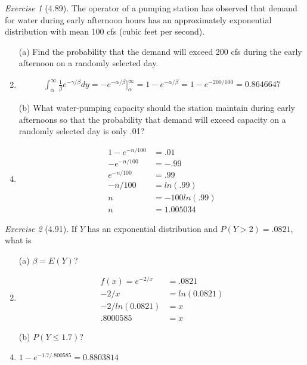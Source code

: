 \documentclass[12pt]{amsart}
\makeatletter
\theoremstyle{remark}
\newtheorem*{exercise}{Exercise}%
\renewenvironment{proof}[1][\proofname]{\par\doublespacing
  \pushQED{\qed}%
  \normalfont \topsep6\p@\@plus6\p@\relax
  \list{}{%
    \settowidth{\leftmargin}{\itshape\proofname:\hskip\labelsep}%
    \setlength{\labelwidth}{0pt}%
    \setlength{\itemindent}{-\leftmargin}%
  }%
  \item[\hskip\labelsep\itshape#1\@addpunct{:}]\ignorespaces
}{%
  \popQED\endlist\@endpefalse
  \singlespacing
}
\theoremstyle{mycomment}
\makeatother
\begin{document}
\begin{exercise}[4.89]
The operator of a pumping station has observed that demand for water during early afternoon hours has an approximately exponential distribution with mean 100 cfs (cubic feet per second).

\begin{enumerate}
    \item[(a)] Find the probability that the demand will exceed 200 cfs during the early afternoon on a randomly selected day.
\begin{proof}[Solution]
  \begin{align*}
  \int_\alpha^{\infty} \frac{1}{\beta} e^{-\gamma/\beta} dy = - e^{-\alpha/\beta} \bigg]_\alpha^\infty = 1 - e^{-\alpha/\beta} = 1 - e^{-200/100} = 0.8646647
  \end{align*}
\end{proof}
    \item[(b)] What water-pumping capacity should the station maintain during early afternoons so that the probability that demand will exceed capacity on a randomly selected day is only .01?
\begin{proof}[Solution]
  \begin{align*}
    1 - e^{-n/100} &= .01 \\
    -e^{-n/100} &=-.99 \\
    e^{-n/100} &= .99 \\
    -n/100 &= ln(.99) \\
    n &= -100ln(.99) \\
    n &= 1.005034
  \end{align*}
\end{proof}
\end{enumerate}
\end{exercise}

\begin{exercise}[4.91]
If $Y$ has an exponential distribution and $P(Y > 2) = .0821$, what is

\begin{enumerate}
    \item[(a)] $\beta = E(Y)$?
\begin{proof}[Solution]
  \begin{align*}
    f(x) = e^{-2/x} &= .0821 \\
               -2/x &= ln(0.0821) \\
       -2/ln(0.0821) &= x \\
            .8000585 &= x
  \end{align*}
\end{proof}
    \item[(b)] $P(Y \leq 1.7)$?
\begin{proof}[Solution]
  $ 1 - e^{-1.7/.800585} = 0.8803814$ 
\end{proof}
\end{enumerate}
\end{exercise}
\end{document}
